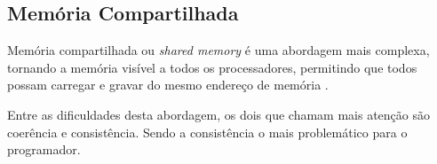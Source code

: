 \subsection{Memória Compartilhada}

Memória compartilhada ou \textit{shared memory} é uma abordagem mais complexa, 
tornando a memória visível a todos os processadores, permitindo que 
todos possam carregar e gravar do mesmo endereço de memória \cite[2.2]{sopc}. 

Entre as dificuldades desta abordagem, os dois que chamam mais atenção são
coerência e consistência.
Sendo a consistência o mais problemático para o programador.





